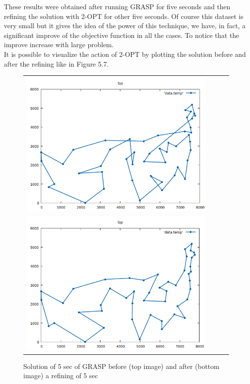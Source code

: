 \noindent These results were obtained after running GRASP for five seconds and then refining the solution with 2-OPT for other five seconds. Of course this dataset is very small but it gives the idea of the power of this technique, we have, in fact, a significant improve of the objective function in all the cases. To notice that the improve increase with large problem. \\
It is possible to visualize the action of 2-OPT by plotting the solution before and after the refining like in Figure 5.7.

\begin{figure}[h!]
\centering
	\begin{tabular}{@{}cccc@{}}
		\includegraphics[scale=0.5]{media/before2opt.png} \\
		\includegraphics[scale=0.5]{media/after2opt.png} \\
	\end{tabular}
	\caption{Solution of 5 sec of GRASP before (top image) and after (bottom image) a refining of 5 sec}
\end{figure}



